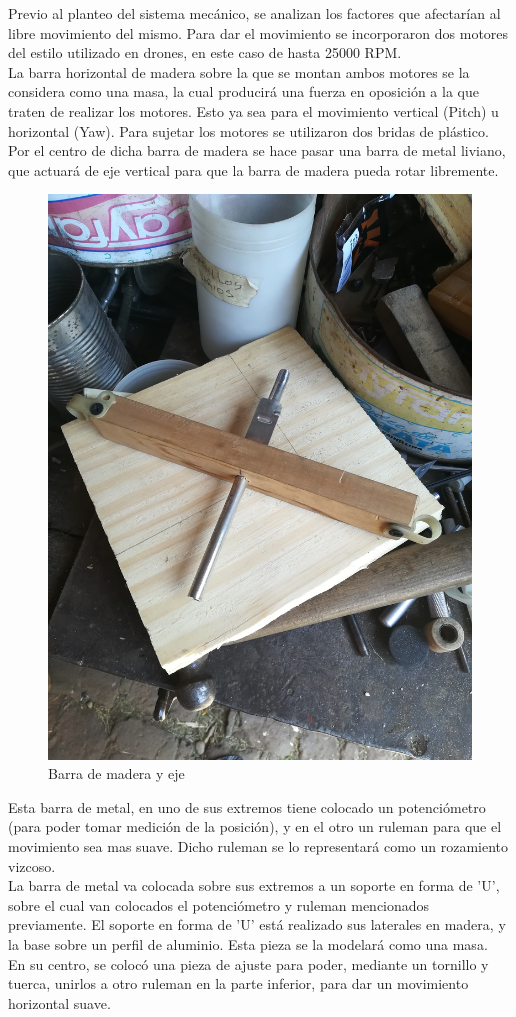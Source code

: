\documentclass{article}
\begin{document}
Previo al planteo del sistema mecánico, se analizan los factores que afectarían al libre movimiento del mismo. Para dar el movimiento se incorporaron dos motores del estilo utilizado en drones, en este caso de hasta 25000 RPM.\\
La barra horizontal de madera sobre la que se montan ambos motores se la considera como una masa, la cual producirá una fuerza en oposición a la que traten de realizar los motores. Esto ya sea para el movimiento vertical (Pitch) u horizontal (Yaw). Para sujetar los motores se utilizaron dos bridas de plástico.\\
Por el centro de dicha barra de madera se hace pasar una barra de metal liviano, que actuará de eje vertical para que la barra de madera pueda rotar libremente.\\

\begin{figure}[H]
\centering
\includegraphics[width=0.4\linewidth]{images/rotor.jpg}
\caption{Barra de madera y eje}
\end{figure}

Esta barra de metal, en uno de sus extremos tiene colocado un potenciómetro (para poder tomar medición de la posición), y en el otro un ruleman para que el movimiento sea mas suave. Dicho ruleman se lo representará como un rozamiento vizcoso.\\
La barra de metal va colocada sobre sus extremos a un soporte en forma de 'U', sobre el cual van colocados el potenciómetro y ruleman mencionados previamente. El soporte en forma de 'U' está realizado sus laterales en madera, y la base sobre un perfil de aluminio. Esta pieza se la modelará como una masa.\\ En su centro, se colocó una pieza de ajuste para poder, mediante un tornillo y tuerca, unirlos a otro ruleman en la parte inferior, para dar un movimiento horizontal suave.\\
\end{document}
